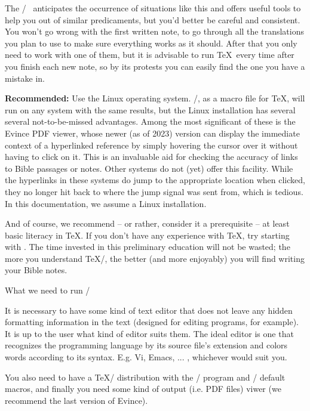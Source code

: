 {The \OpBible/~ anticipates the occurrence of situations like this and offers useful tools to help you out of similar predicaments, but you'd better be careful and consistent. You won't go wrong with the first written note, to go through all the translations you plan to use to make sure everything works as it should.  After that you only need to work with one of them, but it is advisable to run \TeX\ every time  after you finish each new note, so by its protests  you can easily find the one you have a mistake in.

{\bf Recommended:} Use the Linux operating system. \OpBible/, as a macro file for \TeX, will run on any system with the same results, but the Linux installation has several
several not-to-be-missed advantages. Among the most significant of these is the Evince PDF viewer, whose newer (as of 2023) version can display the immediate context of a hyperlinked
reference by simply hovering the cursor over it without having to click on it. This is an invaluable aid for checking the accuracy of links to Bible passages or notes.
Other systems do not (yet) offer this facility. While the hyperlinks in these systems do jump to the appropriate location when clicked, they no longer hit back to where the jump signal was sent from, which is tedious. In this documentation, we assume a Linux installation.

And of course, we recommend -- or rather, consider it a prerequisite -- at least basic literacy in \TeX.
If you don't have any experience with \TeX, try starting with 
. 
The time invested in this preliminary education will not be wasted; the more you understand \TeX/, the better (and more enjoyably) you will find writing your Bible notes.


\sec[Installation] What we need to run \OpBible/

It is necessary to have some kind of text editor that does not leave any hidden formatting information in the text (designed for editing programs, for example). It is up to the user what kind of editor suits them.
The ideal editor is one that recognizes the programming language by its source file's extension and colors words according to its syntax. E.g. Vi, Emacs, ... 
, whichever would suit you. 


You also need to have a \TeX/ distribution with the \LuaTeX/ program and \OpTeX/ default macros, and finally you need some kind of output (i.e. PDF files) viwer (we recommend the last version of Evince).

}
